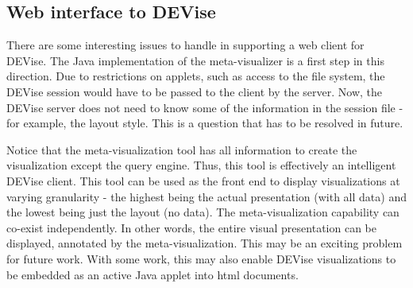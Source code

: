 \subsection{Web interface to DEVise}

There are some interesting issues to handle in supporting a web client
for DEVise. The Java implementation of the meta-visualizer is a first
step in this direction. Due to restrictions on applets, such as access
to the file system, the DEVise session would have to be passed to the
client by the server. Now, the DEVise server does not need to know some of
the information in the session file - for example, the layout style. 
This is a question that has to be resolved in future.

Notice that the meta-visualization tool has all information to create
the visualization except the query engine. Thus, this tool is effectively
an intelligent DEVise client. This tool can be used as the front end
to display visualizations at varying granularity - the highest
being the actual presentation (with all data) and the lowest being just
the layout (no data). The meta-visualization capability can co-exist
independently.  In other words, the entire visual presentation can be
displayed, annotated by the meta-visualization. This may be an exciting
problem for future work. With some work, this may also enable DEVise 
visualizations to be embedded as an active Java applet into html documents.




























